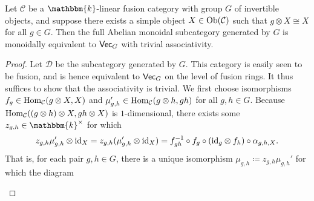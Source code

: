 \newpage


\noindent\begin{proposition}\label{CommutingInvertibles} Let $\mathcal{C}$ be a $\mathbbm{k}$-linear fusion category with group $G$ of invertible objects, and suppose there exists a simple object $X \in \textup{Ob}(\mathcal{C})$ such that $g \otimes X \cong X$ for all $g \in G$. Then the full Abelian monoidal subcategory generated by $G$ is monoidally equivalent to $\textup{\textsf{Vec}}_G$ with trivial associativity.\\
\end{proposition}

\noindent\begin{proof} Let $\mathcal{D}$ be the subcategory generated by $G$. This category is easily seen to be fusion, and is hence equivalent to $\textup{\textsf{Vec}}_G$ on the level of fusion rings. It thus suffices to show that the associativity is trivial. We first choose isomorphisms $f_g \in \textup{Hom}_\mathcal{C}(g \otimes X, X)$ and $\mu_{g,h}' \in \textup{Hom}_\mathcal{C}(g \otimes h, gh)$ for all $g, h \in G$. Because $\textup{Hom}_\mathcal{C}((g \otimes h) \otimes X, gh \otimes X)$ is $1$-dimensional, there exists some $z_{g,h} \in \mathbbm{k}^\times$ for which
\begin{align*}
\begin{split}
z_{g,h}\mu_{g,h}' \otimes \textup{id}_X = z_{g,h}(\mu_{g,h}' \otimes \textup{id}_X) = f_{gh}^{-1} \circ f_g \circ (\textup{id}_g \otimes f_h) \circ \alpha_{g,h,X}.
\end{split}
\end{align*}
\noindent That is, for each pair $g, h \in G$, there is a unique isomorphism $\mu_{g,h} \coloneqq z_{g,h}\mu_{g,h}'$ for which the diagram
\begin{center}
\end{center}

\end{proof}
